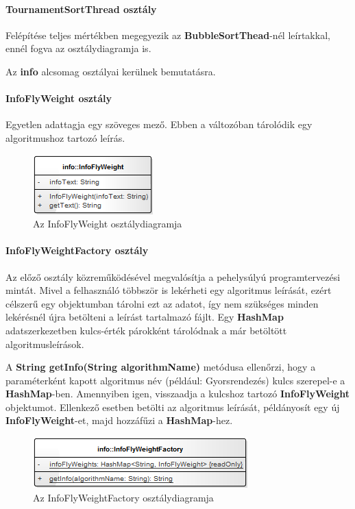 \documentclass{elteikthesis}
\begin{document}
\paragraph{TournamentSortThread osztály}
Felépítése teljes mértékben megegyezik az \textbf{BubbleSortThead}-nél leírtakkal, ennél fogva az osztálydiagramja is.\par
Az \textbf{info} alcsomag osztályai kerülnek bemutatásra.
\paragraph{InfoFlyWeight osztály}
Egyetlen adattagja egy szöveges mező. Ebben a változóban tárolódik egy algoritmushoz tartozó leírás.
\begin{figure}[H]
	\centering
	\includegraphics{pics/class/InfoFlyWeight.png}
	\caption{Az InfoFlyWeight osztálydiagramja}
\end{figure}
\paragraph{InfoFlyWeightFactory osztály}
Az előző osztály közreműködésével megvalósítja a pehelysúlyú programtervezési mintát. Mivel a felhasználó többször is lekérheti egy algoritmus leírását, ezért célszerű egy objektumban tárolni ezt az adatot, így nem szükséges minden lekérésnél újra betölteni a leírást tartalmazó fájlt. Egy \textbf{HashMap} adatszerkezetben kulcs-érték párokként tárolódnak a már betöltött algoritmusleírások.\par
A \textbf{String getInfo(String algorithmName)} metódusa ellenőrzi, hogy a paraméterként kapott algoritmus név (például: Gyorsrendezés) kulcs szerepel-e a \textbf{HashMap}-ben. Amennyiben igen, visszaadja a kulcshoz tartozó \textbf{InfoFlyWeight} objektumot. Ellenkező esetben betölti az algoritmus leírását, példányosít egy új \textbf{InfoFlyWeight}-et, majd hozzáfűzi a \textbf{HashMap}-hez.
\begin{figure}[H]
	\centering
	\includegraphics{pics/class/InfoFlyWeightFactory.png}
	\caption{Az InfoFlyWeightFactory osztálydiagramja}
\end{figure}
\end{document}
